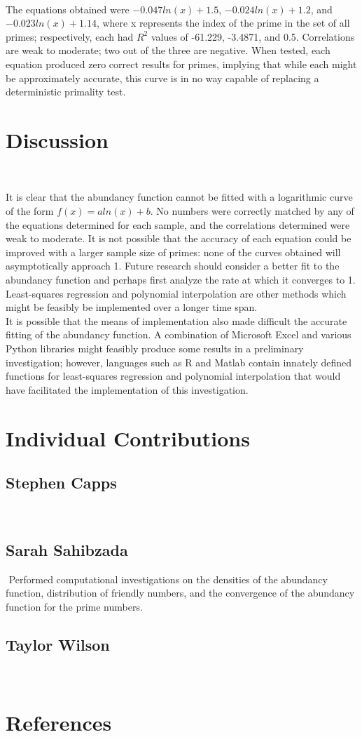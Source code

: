 \documentclass[11pt]{article}
\begin{document}
\\ The equations obtained were $-0.047ln(x) + 1.5$, $-0.024ln(x) + 1.2$, and $-0.023ln(x) + 1.14$, where x represents the index of the prime in the set of all primes; respectively, each had $R^{2}$ values of -61.229, -3.4871, and 0.5. Correlations are weak to moderate; two out of the three are negative. When tested, each equation produced zero correct results for primes, implying that while each might be approximately accurate, this curve is in no way capable of replacing a deterministic primality test.
\section{Discussion}$ $

It is clear that the abundancy function cannot be fitted with a logarithmic curve of the form $f(x) = aln(x) + b$. No numbers were correctly matched by any of the equations determined for each sample, and the correlations determined were weak to moderate. It is not possible that the accuracy of each equation could be improved with a larger sample size of primes: none of the curves obtained will asymptotically approach 1. Future research should consider a better fit to the abundancy function and perhaps first analyze the rate at which it converges to 1. Least-squares regression and polynomial interpolation are other methods which might be feasibly be implemented over a longer time span.
\\It is possible that the means of  implementation also made difficult the accurate fitting of the abundancy function. A combination of Microsoft Excel and various Python libraries might feasibly produce some results in a preliminary investigation; however, languages such as R and Matlab contain innately defined functions for least-squares regression and polynomial interpolation that would have facilitated the implementation of this investigation.



\indent  
\section{Individual Contributions}
\subsection{Stephen Capps}$ $
\indent 
\subsection{Sarah Sahibzada}$ $
\indent Performed computational investigations on the densities of the abundancy function, distribution of friendly numbers, and the convergence of the abundancy function for the prime numbers. 
\subsection{Taylor Wilson}$ $
\indent 

\newpage
\section{References}
\end{document}
